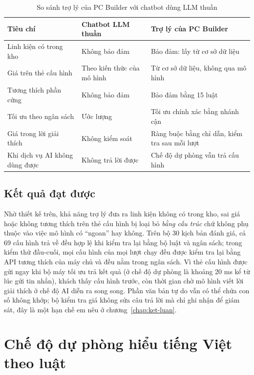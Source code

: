 \begin{table}[H]
\centering\small
\begin{tabular}{|L{4.6cm}|L{4.4cm}|L{4.8cm}|}
\hline
\textbf{Tiêu chí} & \textbf{Chatbot LLM thuần} & \textbf{Trợ lý của PC Builder} \\ \hline
Linh kiện có trong kho & Không bảo đảm & Bảo đảm: lấy từ cơ sở dữ liệu \\ \hline
Giá trên thẻ cấu hình & Theo kiến thức của mô hình & Từ cơ sở dữ liệu, không qua mô hình \\ \hline
Tương thích phần cứng & Không bảo đảm & Bảo đảm bằng 15 luật \\ \hline
Tối ưu theo ngân sách & Ước lượng & Tối ưu chính xác bằng nhánh cận \\ \hline
Giá trong lời giải thích & Không kiểm soát & Ràng buộc bằng chỉ dẫn, kiểm tra sau mỗi lượt \\ \hline
Khi dịch vụ AI không dùng được & Không trả lời được & Chế độ dự phòng vẫn trả cấu hình \\ \hline
\end{tabular}
\caption{So sánh trợ lý của PC Builder với chatbot dùng LLM thuần}
\label{tab:llm-compare}
\end{table}

\subsection{Kết quả đạt được}

Nhờ thiết kế trên, khả năng trợ lý đưa ra linh kiện không có trong kho, sai giá hoặc không tương thích trên thẻ cấu hình bị loại bỏ \emph{bằng cấu trúc} chứ không phụ thuộc vào việc mô hình có ``ngoan'' hay không. Trên bộ 30 kịch bản đánh giá, cả 69 cấu hình trả về đều hợp lệ khi kiểm tra lại bằng bộ luật và ngân sách; trong kiểm thử đầu-cuối, mọi cấu hình của mọi lượt chạy đều được kiểm tra lại bằng API tương thích của máy chủ và đều nằm trong ngân sách. Vì thẻ cấu hình được gửi ngay khi bộ máy tối ưu trả kết quả (ở chế độ dự phòng là khoảng 20 ms kể từ lúc gửi tin nhắn), khách thấy cấu hình trước, còn thời gian chờ mô hình viết lời giải thích ở chế độ AI diễn ra song song. Phần văn bản tự do vẫn có thể chứa con số không khớp; bộ kiểm tra giá không sửa câu trả lời mà chỉ ghi nhận để giám sát, đây là một hạn chế em nêu ở chương~\ref{chap:ket-luan}.

\section{Chế độ dự phòng hiểu tiếng Việt theo luật}

